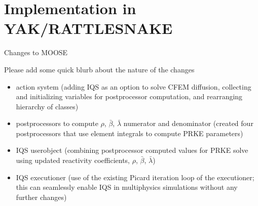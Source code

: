\documentclass[8pt]{beamer}
\newcommand{\bi}{\begin{itemize}}
\newcommand{\ei}{\end{itemize}}
\begin{document}
\section{Implementation in YAK/RATTLESNAKE}

\begin{frame}{Changes to MOOSE}


\begin{block}{}
Please add some quick blurb about the nature of the changes
\bi
\item action system (adding IQS as an option to solve CFEM diffusion, collecting and initializing variables for postprocessor computation, and rearranging hierarchy of classes)
\item postprocessors to compute $\rho$, $\bar{\beta}$, $\bar{\lambda}$ numerator and denominator (created four postprocessors that use element integrals to compute PRKE parameters)
\item IQS userobject (combining postprocessor computed values for PRKE solve using updated reactivity coefficients, $\rho$, $\bar{\beta}$, $\bar{\lambda}$)
\item IQS executioner (use of the existing Picard iteration loop of the executioner; this can seamlessly enable IQS in multiphysics simulations without any further changes)
\ei
\end{block}

\end{frame}
\end{document}
